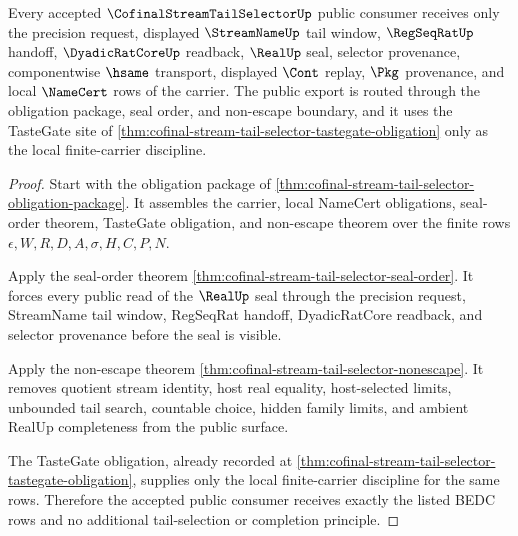 \begin{theorem}
\label{thm:cofinal-stream-tail-selector-public-export}
Every accepted $\CofinalStreamTailSelectorUp$ public consumer receives only the precision request, displayed $\StreamNameUp$ tail window, $\RegSeqRatUp$ handoff, $\DyadicRatCoreUp$ readback, $\RealUp$ seal, selector provenance, componentwise $\hsame$ transport, displayed $\Cont$ replay, $\Pkg$ provenance, and local $\NameCert$ rows of the carrier. The public export is routed through the obligation package, seal order, and non-escape boundary, and it uses the TasteGate site of \autoref{thm:cofinal-stream-tail-selector-tastegate-obligation} only as the local finite-carrier discipline.
\end{theorem}
\begin{proof}
Start with the obligation package of \autoref{thm:cofinal-stream-tail-selector-obligation-package}. It assembles the carrier, local NameCert obligations, seal-order theorem, TasteGate obligation, and non-escape theorem over the finite rows $\epsilon,W,R,D,A,\sigma,H,C,P,N$.

Apply the seal-order theorem \autoref{thm:cofinal-stream-tail-selector-seal-order}. It forces every public read of the $\RealUp$ seal through the precision request, StreamName tail window, RegSeqRat handoff, DyadicRatCore readback, and selector provenance before the seal is visible.

Apply the non-escape theorem \autoref{thm:cofinal-stream-tail-selector-nonescape}. It removes quotient stream identity, host real equality, host-selected limits, unbounded tail search, countable choice, hidden family limits, and ambient RealUp completeness from the public surface.

The TasteGate obligation, already recorded at \autoref{thm:cofinal-stream-tail-selector-tastegate-obligation}, supplies only the local finite-carrier discipline for the same rows. Therefore the accepted public consumer receives exactly the listed BEDC rows and no additional tail-selection or completion principle.
\end{proof}

